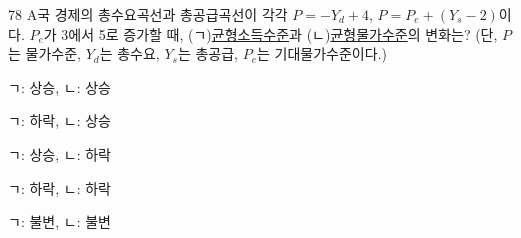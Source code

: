 \begin{question}{78}
A국 경제의 총수요곡선과 총공급곡선이 각각 $P=-Y_d+4$, $P=P_e+(Y_s-2)$이다. $P_e$가 3에서 5로 증가할 때, (ㄱ)\uline{균형소득수준}과 (ㄴ)\uline{균형물가수준}의 변화는? (단, $P$는 물가수준, $Y_d$는 총수요, $Y_s$는 총공급, $P_e$는 기대물가수준이다.)
\begin{choices}
  \item ㄱ: 상승, ㄴ: 상승
  \item ㄱ: 하락, ㄴ: 상승
  \item ㄱ: 상승, ㄴ: 하락
  \item ㄱ: 하락, ㄴ: 하락
  \item ㄱ: 불변, ㄴ: 불변
\end{choices}
\end{question}

